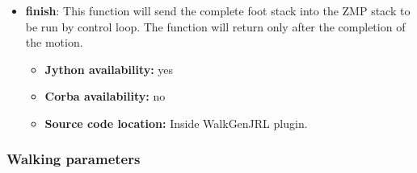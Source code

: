 \begin{itemize}
\item {\bf finish}: This function will send the complete foot stack into
the ZMP stack to be run by control loop.
The function will return only after the completion of the motion.

\begin{itemize}
\item \textbf{Jython availability:} yes
\item \textbf{Corba availability:} no
\item \textbf{Source code location:} Inside WalkGenJRL plugin.
\end{itemize}

\end{itemize}

\subsubsection{Walking parameters}
